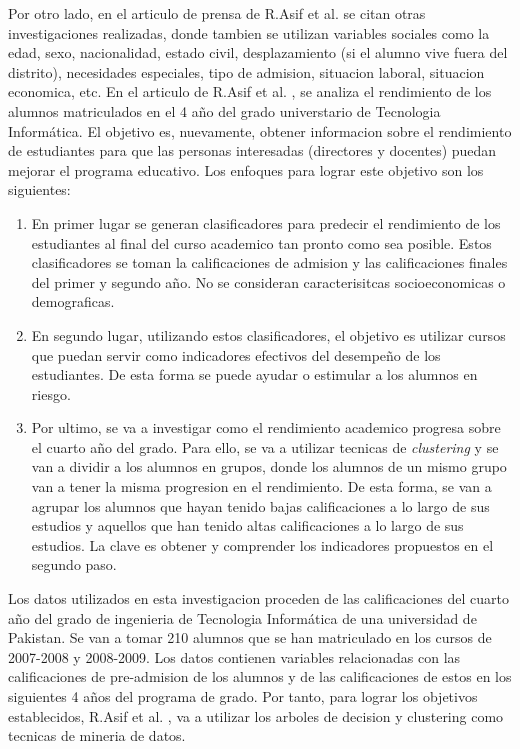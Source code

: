 \documentclass[spanish,12pt, a4paper,twoside]{paper}
\begin{document}
\justify
Por otro lado, en el articulo de prensa de R.Asif et al. \cite{AsifR2017} se citan otras investigaciones realizadas, donde tambien se utilizan variables sociales como la edad, sexo, nacionalidad, estado civil, desplazamiento (si el alumno vive fuera del distrito), necesidades especiales, tipo de admision, situacion laboral, situacion economica, etc.
\justify
En el articulo de R.Asif et al. \cite{AsifR2017}, se analiza el rendimiento de los alumnos matriculados en el 4 año del grado universtario de Tecnologia Informática. El objetivo es, nuevamente, obtener informacion sobre el rendimiento de estudiantes para que las personas interesadas (directores y docentes) puedan mejorar el programa educativo. Los enfoques para lograr este objetivo son los siguientes:
\begin{enumerate}
\item En primer lugar se generan clasificadores para predecir el rendimiento de los estudiantes al final del curso academico tan pronto como sea posible. Estos clasificadores se toman la calificaciones de admision y las calificaciones finales del primer y segundo año. No se consideran caracterisitcas socioeconomicas o demograficas.
\item En segundo lugar, utilizando estos clasificadores, el objetivo es utilizar cursos que puedan servir como indicadores efectivos del desempeño de los estudiantes. De esta forma se puede ayudar o estimular a los alumnos en riesgo.
\item Por ultimo, se va a investigar como el rendimiento academico progresa sobre el cuarto año del grado. Para ello, se va a utilizar tecnicas de \textit{clustering} y se van a dividir a los alumnos en grupos, donde los alumnos de un mismo grupo van a tener la misma progresion en el rendimiento. De esta forma, se van a agrupar los alumnos que hayan tenido bajas calificaciones a lo largo de sus estudios y aquellos que han tenido altas calificaciones a lo largo de sus estudios. La clave es obtener y comprender los indicadores propuestos en el segundo paso.
\end{enumerate}
\justify
Los datos utilizados en esta investigacion proceden de las calificaciones del cuarto año del grado de ingenieria de Tecnologia Informática de una universidad de Pakistan. Se van a tomar 210 alumnos que se han matriculado en los cursos de 2007-2008 y 2008-2009. Los datos contienen variables relacionadas con las calificaciones de pre-admision de los alumnos y de las calificaciones de estos en los siguientes 4 años del programa de grado.
Por tanto, para lograr los objetivos establecidos, R.Asif et al. \cite{AsifR2017}, va a utilizar los arboles de decision y clustering como tecnicas de mineria de datos.
\justify
\end{document}
